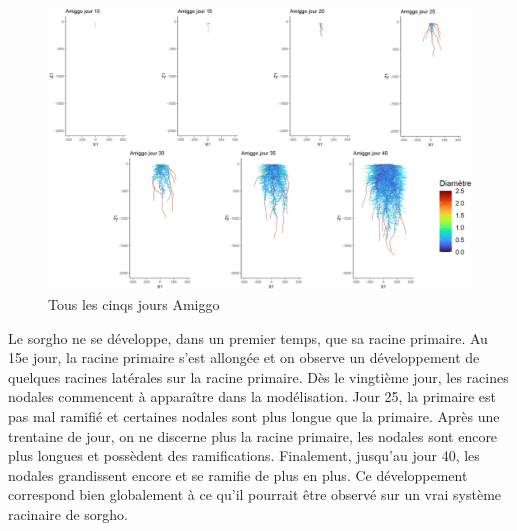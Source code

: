 \begin{figure}[ht]
\centering
\includegraphics[width=1\textwidth]{Image/root_day.png}
\caption{Tous les cinqs jours Amiggo}
\label{fig:roots_day}
\end{figure}

Le sorgho ne se développe, dans un premier temps, que sa racine primaire.
Au 15e jour, la racine primaire s'est allongée et on observe un développement de quelques racines latérales sur la racine primaire.
Dès le vingtième jour, les racines nodales commencent à apparaître dans la modélisation.
Jour 25, la primaire est pas mal ramifié et certaines nodales sont plus longue que la primaire.
Après une trentaine de jour, on ne discerne plus la racine primaire, les nodales sont encore plus longues et possèdent des ramifications.
Finalement, jusqu'au jour 40, les nodales grandissent encore et se ramifie de plus en plus.
Ce développement correspond bien globalement à ce qu'il pourrait être observé sur un vrai système racinaire de sorgho.
